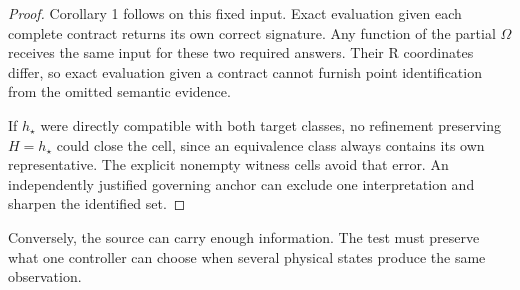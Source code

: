 \begin{proof}
Corollary 1 follows on this fixed input. Exact evaluation given each complete contract returns its own correct signature. Any function of the partial \(\Omega\) receives the same input for these two required answers. Their R coordinates differ, so exact evaluation given a contract cannot furnish point identification from the omitted semantic evidence.

If \(h_\star\) were directly compatible with both target classes, no refinement preserving \(H=h_\star\) could close the cell, since an equivalence class always contains its own representative. The explicit nonempty witness cells avoid that error. An independently justified governing anchor can exclude one interpretation and sharpen the identified set.

\end{proof}

Conversely, the source can carry enough information. The test must preserve what one controller can choose when several physical states produce the same observation.


